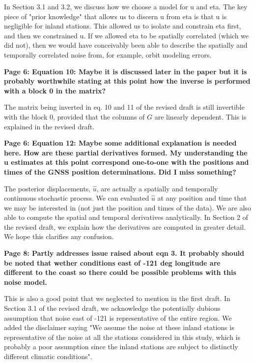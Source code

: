 \documentclass[10pt,a4paper]{letter}
\begin{document}
\begin{letter}{}
In Section 3.1 and 3.2, we discuss how we choose a model for u and
eta. The key piece of "prior knowledge" that allows us to discern u
from eta is that u is negligible for inland stations. This allowed us
to isolate and constrain eta first, and then we constrained u. If we
allowed eta to be spatially correlated (which we did not), then we
would have conceivably been able to describe the spatially and
temporally correlated noise from, for example, orbit modeling errors.

\textbf{Page 6: Equation 10: Maybe it is discussed later in the paper but it
is probably worthwhile stating at this point how the inverse is
performed with a block 0 in the matrix?}

The matrix being inverted in eq. 10 and 11 of the revised draft is
still invertible with the block 0, provided that the columns of
$G$ are linearly dependent. This is explained in the revised
draft.

\textbf{Page 6: Equation 12: Maybe some additional explanation is
needed here. How are these partial derivatives formed.  My
understanding the u estimates at this point correspond one-to-one with
the positions and times of the GNSS position determinations.  Did I
miss something?}

The posterior displacements, $\hat{u}$, are actually a spatially and
temporally continuous stochastic process. We can evaluated $\hat{u}$
at any position and time that we may be interested in (not just the
position and times of the data). We are also able to compute the
spatial and temporal derivatives analytically. In Section 2 of the
revised draft, we explain how the derivatives are computed in greater
detail. We hope this clarifies any confusion.

\textbf{Page 8: Partly addresses issue raised about eqn 3.  It
probably should be noted that wether conditions east of -121 deg
longitude are different to the coast so there could be possible
problems with this noise model.}

This is also a good point that we neglected to mention in the first
draft. In Section 3.1 of the revised draft, we acknowledge the
potentially dubious assumption that noise east of -121 is
representative of the entire region. We added the disclaimer saying
"We assume the noise at these inland stations is representative of the
noise at all the stations considered in this study, which is probably
a poor assumption since the inland stations are subject to distinctly
different climatic conditions".


\end{letter}
\end{document}
